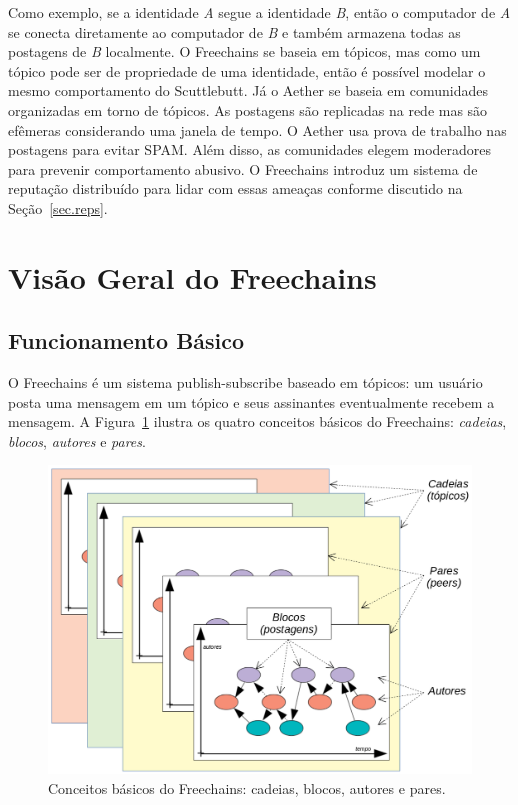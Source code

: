 \documentclass[12pt]{article}
\newcommand{\FC} {Freechains\xspace}
\begin{document}
Como exemplo, se a identidade \emph{A} segue a identidade \emph{B}, então o
computador de \emph{A} se conecta diretamente ao computador de \emph{B} e
também armazena todas as postagens de \emph{B} localmente.
O \FC se baseia em tópicos, mas como um tópico pode ser de propriedade de uma
identidade, então é possível modelar o mesmo comportamento do Scuttlebutt.
Já o Aether se baseia em comunidades organizadas em torno de tópicos.
As postagens são replicadas na rede mas são efêmeras considerando uma janela de
tempo.
O Aether usa prova de trabalho nas postagens para evitar SPAM.
Além disso, as comunidades elegem moderadores para prevenir comportamento
abusivo.
O \FC introduz um sistema de reputação distribuído para lidar com essas
ameaças conforme discutido na Seção~\ref{sec.reps}.

\section{Visão Geral do \FC}
\label{sec.freechains}

\subsection{Funcionamento Básico}

O \FC é um sistema publish-subscribe baseado em tópicos: um usuário
posta uma mensagem em um tópico e seus assinantes eventualmente recebem a
mensagem.
A Figura~\ref{fig.all} ilustra os quatro conceitos básicos do \FC:
\emph{cadeias}, \emph{blocos}, \emph{autores} e \emph{pares}.

\begin{figure}[ht]
\centering
\includegraphics[width=.75\textwidth]{all.png}
\caption{Conceitos básicos do \FC: cadeias, blocos, autores e pares.}
\label{fig.all}
\end{figure}
\end{document}
